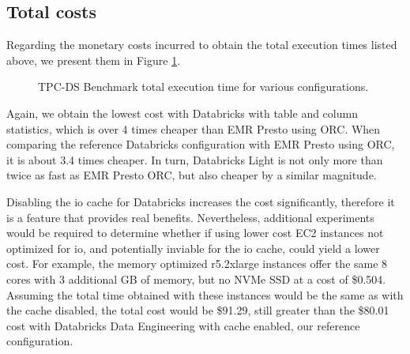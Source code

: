 \subsection{Total costs}\label{resultsSummaryTotalCost}

Regarding the monetary costs incurred to obtain the total execution times listed above, we present them in Figure \ref{fig:resultsSummaryTotalCosts}.

\begin{figure}
   \begin{center}
   \end{center}
   \caption{TPC-DS Benchmark total execution time for various configurations.}
   \label{fig:resultsSummaryTotalCosts}
\end{figure}

Again, we obtain the lowest cost with Databricks with table and column statistics, which is over 4 times cheaper than EMR Presto using ORC. When comparing the reference Databricks configuration with EMR Presto using ORC, it is about 3.4 times cheaper. In turn, Databricks Light is not only more than twice as fast as EMR Presto ORC, but also cheaper by a similar magnitude.

Disabling the io cache for Databricks increases the cost significantly, therefore it is a feature that provides real benefits. Nevertheless, additional experiments would be required to determine whether if using lower cost EC2 instances not optimized for io, and potentially inviable for the io cache, could yield a lower cost. For example, the memory optimized r5.2xlarge instances offer the same 8 cores with 3 additional GB of memory, but no NVMe SSD at a cost of \$0.504. Assuming the total time obtained with these instances would be the same as with the cache disabled, the total cost would be \$91.29, still greater than the \$80.01 cost with Databricks Data Engineering with cache enabled, our reference configuration.

